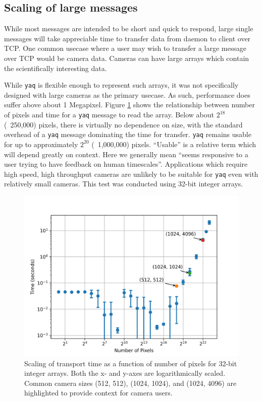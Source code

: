 \documentclass[11pt, full]{article}
\newcommand\yaq{\texttt{yaq}}
\begin{document}
\subsection{Scaling of large messages}

While most messages are intended to be short and quick to respond, large single messages will take appreciable time to transfer data from daemon to client over TCP.
One common usecase where a user may wish to transfer a large message over TCP would be camera data.
Cameras can have large arrays which contain the scientifically interesting data.

While \yaq{} is flexible enough to represent such arrays, it was not specifically designed with large cameras as the primary usecase.
As such, performance does suffer above about 1 Megapixel.
Figure \ref{si:fig:scaling} shows the relationship between number of pixels and time for a \yaq{} message to read the array.
Below about $2^{18}$ (~250,000) pixels, there is virtually no dependence on size, with the standard overhead of a \yaq{} message dominating the time for transfer.
\yaq{} remains usable for up to approximately $2^{20}$ (~1,000,000) pixels.
``Usable'' is a relative term which will depend greatly on context.
Here we generally mean ``seems responsive to a user trying to have feedback on human timescales''.
Applications which require high speed, high throughput cameras are unlikely to be suitable for \yaq{} even with relatively small cameras.
This test was conducted using 32-bit integer arrays.

\begin{figure}
  \includegraphics[width=.75\columnwidth]{figures/scaling/scaling}
	\caption{\label{si:fig:scaling} Scaling of transport time as a function of number of pixels for 32-bit integer arrays. Both the x- and y-axes are logarithmically scaled. Common camera sizes (512, 512), (1024, 1024), and (1024, 4096) are highlighted to provide context for camera users.}
\end{figure}
\end{document}
